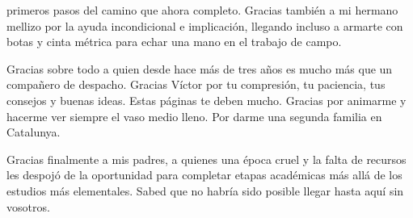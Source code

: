\documentclass[11pt,twoside]{reedthesis}
\begin{document}
\begin{acknowledgements}
    primeros pasos del camino que ahora completo. Gracias también a mi
    hermano mellizo por la ayuda incondicional e implicación, llegando
    incluso a armarte con botas y cinta métrica para echar una mano en el
    trabajo de campo.\par
    Gracias sobre todo a quien desde hace más de tres años es mucho más que
    un compañero de despacho. Gracias Víctor por tu compresión, tu
    paciencia, tus consejos y buenas ideas. Estas páginas te deben mucho.
    Gracias por animarme y hacerme ver siempre el vaso medio lleno. Por
    darme una segunda familia en Catalunya.\par
    Gracias finalmente a mis padres, a quienes una época cruel y la falta de
    recursos les despojó de la oportunidad para completar etapas académicas
    más allá de los estudios más elementales. Sabed que no habría sido
    posible llegar hasta aquí sin vosotros.\par
  \end{acknowledgements}

  \hypersetup{linkcolor=black}
  \setcounter{tocdepth}{2}
  \tableofcontents

  \listoftables
\end{document}
